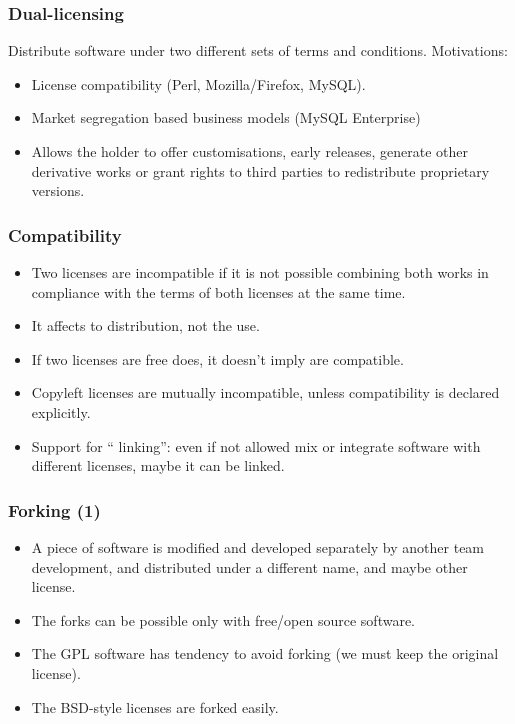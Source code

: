 \begin{frame}
\frametitle{Dual-licensing}

Distribute software under two different sets of terms and conditions. Motivations:

\begin{itemize}
\item License compatibility (Perl, Mozilla/Firefox, MySQL).
\item Market segregation based business models (MySQL Enterprise)
\item Allows the holder to offer customisations, early releases, generate other derivative works or grant rights to third parties to redistribute proprietary versions.
\end{itemize}

                                                 
\end{frame}



\begin{frame}
\frametitle{Compatibility}

\begin{itemize}
\item Two licenses are incompatible if it is not possible combining both works in compliance with the terms of  both licenses at the same time. 
\item It affects to distribution, not the use. 
\item If two licenses are free does, it doesn't imply are compatible. 
\item Copyleft licenses are mutually incompatible, unless compatibility is declared explicitly. 
\item Support for `` linking'': even if not allowed mix or integrate software with different licenses, maybe it can be linked. 
\end{itemize}

\end{frame}


\begin{frame}
\frametitle{Forking (1)}

\begin{itemize}
\item A piece of software is modified and developed separately by another team development, and distributed under a different name, and maybe other
license.
\item The forks can be possible \alert{only} with free/open source software.
\item The GPL software has tendency to avoid forking (we must keep the original license).
\item The BSD-style licenses are forked easily.
\end{itemize}

\end{frame}

